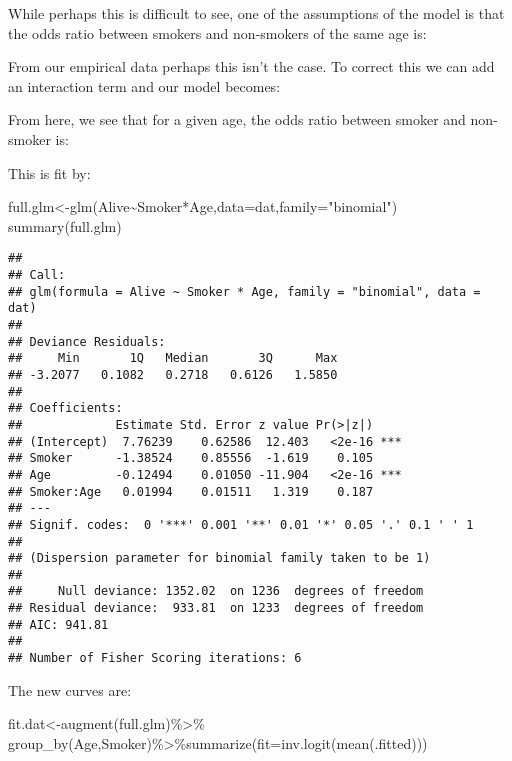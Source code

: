 \documentclass[
]{article}
\newenvironment{Shaded}{\begin{snugshade}}{\end{snugshade}}
\newcommand{\AttributeTok}[1]{\textcolor[rgb]{0.77,0.63,0.00}{#1}}
\newcommand{\FunctionTok}[1]{\textcolor[rgb]{0.00,0.00,0.00}{#1}}
\newcommand{\NormalTok}[1]{#1}
\newcommand{\OtherTok}[1]{\textcolor[rgb]{0.56,0.35,0.01}{#1}}
\newcommand{\SpecialCharTok}[1]{\textcolor[rgb]{0.00,0.00,0.00}{#1}}
\newcommand{\StringTok}[1]{\textcolor[rgb]{0.31,0.60,0.02}{#1}}
\begin{document}
While perhaps this is difficult to see, one of the assumptions of the
model is that the odds ratio between smokers and non-smokers of the same
age is:

\vspace{.5in}

From our empirical data perhaps this isn't the case. To correct this we
can add an interaction term and our model becomes:

\vspace{1.in}

From here, we see that for a given age, the odds ratio between smoker
and non-smoker is:

\vspace{1.in}

This is fit by:

\begin{Shaded}
\begin{Highlighting}[]
\NormalTok{full.glm}\OtherTok{\textless{}{-}}\FunctionTok{glm}\NormalTok{(Alive}\SpecialCharTok{\textasciitilde{}}\NormalTok{Smoker}\SpecialCharTok{*}\NormalTok{Age,}\AttributeTok{data=}\NormalTok{dat,}\AttributeTok{family=}\StringTok{"binomial"}\NormalTok{)}
\FunctionTok{summary}\NormalTok{(full.glm)}
\end{Highlighting}
\end{Shaded}

\begin{verbatim}
## 
## Call:
## glm(formula = Alive ~ Smoker * Age, family = "binomial", data = dat)
## 
## Deviance Residuals: 
##     Min       1Q   Median       3Q      Max  
## -3.2077   0.1082   0.2718   0.6126   1.5850  
## 
## Coefficients:
##             Estimate Std. Error z value Pr(>|z|)    
## (Intercept)  7.76239    0.62586  12.403   <2e-16 ***
## Smoker      -1.38524    0.85556  -1.619    0.105    
## Age         -0.12494    0.01050 -11.904   <2e-16 ***
## Smoker:Age   0.01994    0.01511   1.319    0.187    
## ---
## Signif. codes:  0 '***' 0.001 '**' 0.01 '*' 0.05 '.' 0.1 ' ' 1
## 
## (Dispersion parameter for binomial family taken to be 1)
## 
##     Null deviance: 1352.02  on 1236  degrees of freedom
## Residual deviance:  933.81  on 1233  degrees of freedom
## AIC: 941.81
## 
## Number of Fisher Scoring iterations: 6
\end{verbatim}

The new curves are:

\begin{Shaded}
\begin{Highlighting}[]
\NormalTok{fit.dat}\OtherTok{\textless{}{-}}\FunctionTok{augment}\NormalTok{(full.glm)}\SpecialCharTok{\%\textgreater{}\%} 
\FunctionTok{group\_by}\NormalTok{(Age,Smoker)}\SpecialCharTok{\%\textgreater{}\%}\FunctionTok{summarize}\NormalTok{(}\AttributeTok{fit=}\FunctionTok{inv.logit}\NormalTok{(}\FunctionTok{mean}\NormalTok{(.fitted)))}
\end{Highlighting}
\end{Shaded}
\end{document}
